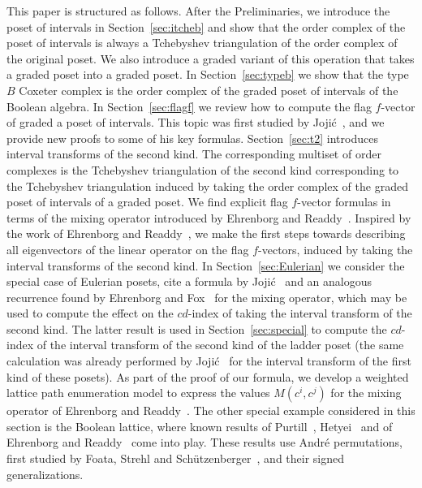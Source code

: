 \documentclass[reqno,12pt]{amsart}
\numberwithin{equation}{section}
\newcommand{\0}{\widehat{0}}
\newcommand{\1}{\widehat{1}}
\newcommand{\2}{\widehat{2}}
\begin{document}
This paper is structured as follows. After the Preliminaries, we
introduce the poset of intervals in Section~\ref{sec:itcheb} and show
that the order complex of the poset of intervals is always a Tchebyshev
triangulation of the order complex of the original poset. We also introduce
a graded variant of this operation that takes a graded poset into a
graded poset. In Section~\ref{sec:typeb} we show that the type $B$
Coxeter complex is the order complex of the graded poset of intervals of the
Boolean algebra. In Section~\ref{sec:flagf} we review how to compute the
flag $f$-vector of graded a poset of intervals. This topic was first
studied by Joji\'{c}~\cite{Jojic}, and we provide new proofs to some of
his key formulas. Section~\ref{sec:t2} introduces interval transforms of
the second kind. The corresponding multiset of order complexes is the
Tchebyshev triangulation of the second kind corresponding to the
Tchebyshev triangulation induced by taking the order complex of the
graded poset of intervals of a graded poset. We find explicit flag
$f$-vector formulas in terms of the mixing operator introduced by  
Ehrenborg and Readdy~\cite{Ehrenborg-Readdy-cop}. Inspired by the work
of Ehrenborg and Readdy~\cite{Ehrenborg-Readdy-Tch}, we make the first
steps towards describing all eigenvectors of the linear operator on the
flag $f$-vectors, induced by taking the interval transforms of the
second kind. In Section~\ref{sec:Eulerian} we consider the special case
of Eulerian posets, cite a formula by Joji\'{c}~\cite{Jojic} and an
analogous recurrence found by Ehrenborg and Fox~\cite{Ehrenborg-Fox} for
the mixing operator, which may be used to compute the effect on the
$cd$-index of taking the interval transform of the second kind. 
The latter result is used in Section~\ref{sec:special} to compute the
$cd$-index of the interval transform of the second kind of the ladder
poset (the same calculation was already performed by
Joji\'{c}~\cite{Jojic} for the interval transform of the first kind of
these posets). As part of the proof of our formula, we develop a
weighted lattice path enumeration model to express the values
$M(c^i,c^j)$ for the mixing operator of Ehrenborg and
Readdy~\cite{Ehrenborg-Readdy-cop}. The other special example considered
in this section is the Boolean lattice, where known results of
Purtill~\cite{Purtill}, Hetyei~\cite{Hetyei-andre} and of Ehrenborg and
Readdy~\cite{Ehrenborg-Readdy-rcubical} come into play. These results
use Andr\'e permutations, first studied by Foata, Strehl and 
Sch\"utzenberger~\cite{Foata-Schutzenberger,Foata-Strehl}, and their
signed generalizations. 
\end{document}
